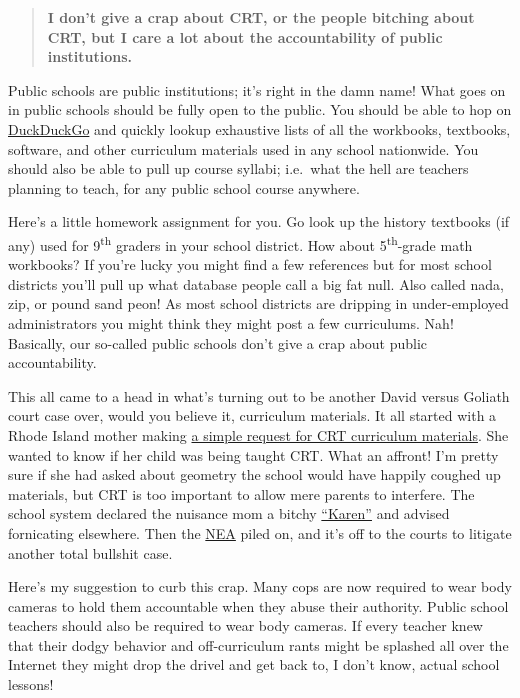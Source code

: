 \begin{quote}
\textbf{I don't give a crap about CRT, or the people bitching about CRT,
but I care a lot about the accountability of public institutions.}
\end{quote}

Public schools are public institutions; it's right in the damn name!
What goes on in public schools should be fully open to the public. You
should be able to hop on \href{https://duckduckgo.com/}{DuckDuckGo} and
quickly lookup exhaustive lists of all the workbooks, textbooks,
software, and other curriculum materials used in any school nationwide.
You should also be able to pull up course syllabi; i.e.~what the hell
are teachers planning to teach, for any public school course anywhere.

Here's a little homework assignment for you. Go look up the history
textbooks (if any) used for 9\textsuperscript{th} graders in your school
district. How about 5\textsuperscript{th}-grade math workbooks? If
you're lucky you might find a few references but for most school
districts you'll pull up what database people call a big fat null. Also
called nada, zip, or pound sand peon! As most school districts are
dripping in under-employed administrators you might think they might
post a few curriculums. Nah! Basically, our so-called public schools
don't give a crap about public accountability.

This all came to a head in what's turning out to be another David versus
Goliath court case over, would you believe it, curriculum materials. It
all started with a Rhode Island mother making
\href{https://nypost.com/2021/08/05/teachers-union-sues-mom-over-requests-for-crt-curriculum-info/}{a
simple request for CRT curriculum materials}. She wanted to know if her
child was being taught CRT. What an affront! I'm pretty sure if she had
asked about geometry the school would have happily coughed up materials,
but CRT is too important to allow mere parents to interfere. The school
system declared the nuisance mom a bitchy \href{https://www.dictionary.com/e/slang/karen/}{``Karen''} and advised
fornicating elsewhere. Then the \href{https://www.nea.org/}{NEA} piled on, and it's off to the courts
to litigate another total bullshit case.


Here's my suggestion to curb this crap. Many cops are now required to
wear body cameras to hold them accountable when they abuse their
authority. Public school teachers should also be required to wear body
cameras. If every teacher knew that their dodgy behavior and
off-curriculum rants might be splashed all over the Internet they might
drop the drivel and get back to, I don't know, actual school lessons!

